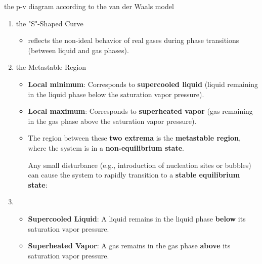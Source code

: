 \begin{example}
    the p-v diagram according to the van der Waals model 
    \begin{enumerate}
        \item the "S"-Shaped Curve
        \begin{itemize}
            \item reflects the non-ideal behavior of real gases during phase transitions (between liquid and gas phases).
        \end{itemize}
        \item the Metastable Region
        \begin{itemize}
            \item \textbf{Local minimum}: Corresponds to \textbf{supercooled liquid} (liquid remaining in the liquid phase below the saturation vapor pressure).
            \item \textbf{Local maximum}: Corresponds to \textbf{superheated vapor} (gas remaining in the gas phase above the saturation vapor pressure).
            \item The region between these \textbf{two extrema} is the \textbf{metastable region}, where the system is in a \textbf{non-equilibrium state}.
            
            Any small disturbance (e.g., introduction of nucleation sites or bubbles) can cause the system to rapidly transition to a \textbf{stable equilibrium state}:
        \end{itemize}
        \item \begin{itemize}
            \item \textbf{Supercooled Liquid}:
             A liquid remains in the liquid phase \textbf{below} its saturation vapor pressure.
            \item \textbf{Superheated Vapor}:
             A gas remains in the gas phase \textbf{above} its saturation vapor pressure.
        \end{itemize}
    \end{enumerate}
\end{example}



















\ifx\allfiles\undefined

\fi
